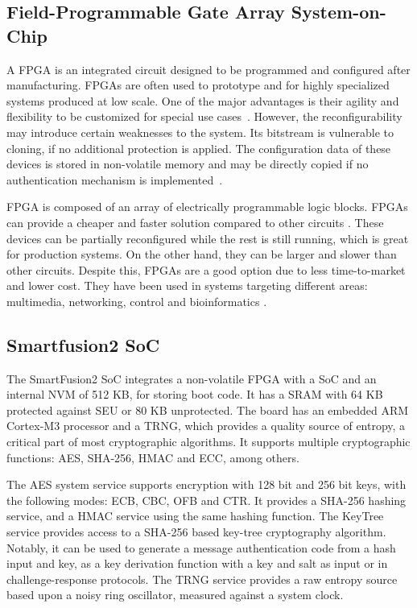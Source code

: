 \subsection{Field-Programmable Gate Array System-on-Chip}\label{chap:background:computing:smartfusion}
A \ac{FPGA} is an integrated circuit designed to be programmed and configured after manufacturing. \ac{FPGA}s are often used to prototype and for highly specialized systems produced at low scale. One of the major advantages is their agility and flexibility to be customized for special use cases~\cite{cyberphysicalsystems}. However, the reconfigurability may introduce certain weaknesses to the system. Its bitstream is vulnerable to cloning, if no additional protection is applied. The configuration data of these devices is stored in non-volatile memory and may be directly copied if no authentication mechanism is implemented~\cite{drimer2007authentication}.

FPGA is composed of an array of electrically programmable logic blocks. FPGAs can provide a cheaper and faster solution compared to other circuits \cite{farooq2012fpga}. These devices can be partially reconfigured while the rest is still running, which is great for production systems. On the other hand, they can be larger and slower than other circuits. 
Despite this, FPGAs are a good option due to less time-to-market and lower cost. They have been used in systems targeting different areas: multimedia, networking, control and bioinformatics \cite{dorta2009overview}.

\subsection*{Smartfusion2 SoC}\label{chap:background:computing:smartfusion}

The SmartFusion2 \ac{SoC} integrates a non-volatile \ac{FPGA} with a \ac{SoC} and an internal \ac{NVM} of 512 KB, for storing boot code.
It has a \ac{SRAM} with 64 KB protected against \ac{SEU} or 80 KB unprotected. The board has an embedded ARM Cortex-M3 processor and a \ac{TRNG}, which provides a quality source of entropy, a critical part of most cryptographic algorithms. It supports multiple cryptographic functions: \ac{AES}, \ac{SHA}-256, \ac{HMAC} and \ac{ECC}, among others.

The \ac{AES} system service supports encryption with 128 bit and 256 bit keys, with the following modes: ECB, CBC, OFB and CTR.
It provides a \ac{SHA}-256 hashing service, and a \ac{HMAC} service using the same hashing function.
The KeyTree service provides access to a SHA-256 based key-tree cryptography algorithm. Notably, it can be used to generate a message authentication code from a hash input and key, as a key derivation function with a key and salt as input or in challenge-response protocols.
The \ac{TRNG} service provides a raw entropy source based upon a noisy ring oscillator, measured against a system clock.

